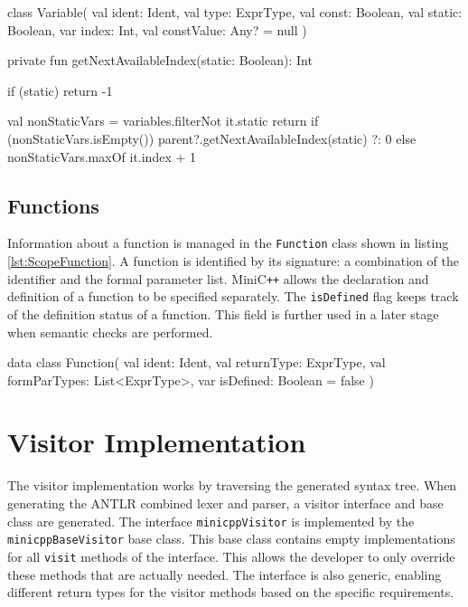 \begin{KotlinCode}[float,numbers=none,caption=Implementation of the \texttt{Variable} class., label=lst:ScopeVariable]
class Variable(
    val ident: Ident,
    val type: ExprType,
    val const: Boolean,
    val static: Boolean,
    var index: Int,
    val constValue: Any? = null
)
\end{KotlinCode}

\begin{KotlinCode}[float,numbers=none,caption=Implementation of the \texttt{getNextAvailableIndex} method., label=lst:ScopeVariableIndex]
private fun getNextAvailableIndex(static: Boolean): Int {
       if (static) 
           return -1
       
       val nonStaticVars = variables.filterNot { it.static }
       return if (nonStaticVars.isEmpty()) {
           parent?.getNextAvailableIndex(static) ?: 0
       } else {
           nonStaticVars.maxOf { it.index } + 1
       }
}
\end{KotlinCode}

\subsection{Functions}

Information about a function is managed in the \verb|Function| class shown in listing \ref{lst:ScopeFunction}. A function is identified by its signature: a combination of the identifier and the formal parameter list. MiniC\verb|++| allows the declaration and definition of a function to be specified separately. The \verb|isDefined| flag keeps track of the definition status of a function. This field is further used in a later stage when semantic checks are performed.  


\begin{KotlinCode}[float,numbers=none,caption=Implementation of the \texttt{Function} class., label=lst:ScopeFunction]
data class Function(
       val ident: Ident,
       val returnType: ExprType,
       val formParTypes: List<ExprType>,
       var isDefined: Boolean = false
)
\end{KotlinCode}

\section{Visitor Implementation}

The visitor implementation works by traversing the generated syntax tree. When generating the ANTLR combined lexer and parser, a visitor interface and base class are generated. The interface \verb|minicppVisitor| is implemented by the \verb|minicppBaseVisitor| base class. This base class contains empty implementations for all \verb|visit| methods of the interface. This allows the developer to only override these methods that are actually needed. The interface is also generic, enabling different return types for the visitor methods based on the specific requirements. 

